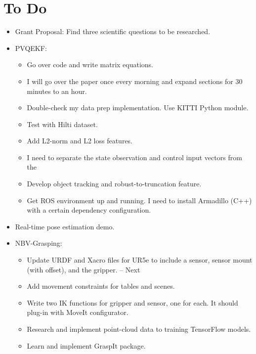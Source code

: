 \documentclass[11pt]{article}
\begin{document}
\section{To Do}
\begin{itemize}
  \item Grant Proposal: Find three scientific questions to be researched.
  \item PVQEKF:
  \begin{itemize}
      \item Go over code and write matrix equations.
      \item I will go over the paper once every morning and expand sections for 30 minutes to an hour.
      \item Double-check my data prep implementation. Use KITTI Python module.
      \item Test with Hilti dataset.
      \item Add L2-norm and L2 loss features.
      \item I need to separate the state observation and control input vectors from the
      \item Develop object tracking and robust-to-truncation feature.
      \item Get ROS environment up and running. I need to install Armadillo (C++) with a certain dependency configuration.
  \end{itemize}

  \item Real-time pose estimation demo.
  \item NBV-Grasping:
      \begin{itemize}
      \item Update URDF and Xacro files for UR5e to include a sensor, sensor mount (with offset), and the gripper. -- Next
      \item Add movement constraints for tables and scenes.
      \item Write two IK functions for gripper and sensor, one for each. It should plug-in with MoveIt configurator.
      \item Research and implement point-cloud data to training TensorFlow models.
      \item Learn and implement GraspIt package.
      \end{itemize}
\end{itemize}
\end{document}
